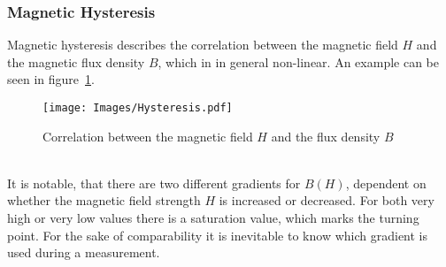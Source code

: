 \subsubsection{Magnetic Hysteresis}
\label{toc:Hysteresis}
Magnetic hysteresis describes the correlation between the magnetic field $H$ and the magnetic flux density $B$, which in in general non-linear. 
An example can be seen in figure~\ref{fig:MagHysteresis}.
\begin{figure}[h]
	\centering
	\texttt{[image: Images/Hysteresis.pdf]}
	\caption[Magnetic Hysteresis]{Correlation between the magnetic field $H$ and the flux density $B$ \cite{Hysteresis}}
	\label{fig:MagHysteresis}
\end{figure}\\
It is notable, that there are two different gradients for $B(H)$, dependent on whether the magnetic field strength $H$ is increased or decreased. 
For both very high or very low values there is a saturation value, which marks the turning point. 
For the sake of comparability it is inevitable to know which gradient is used during a measurement.

